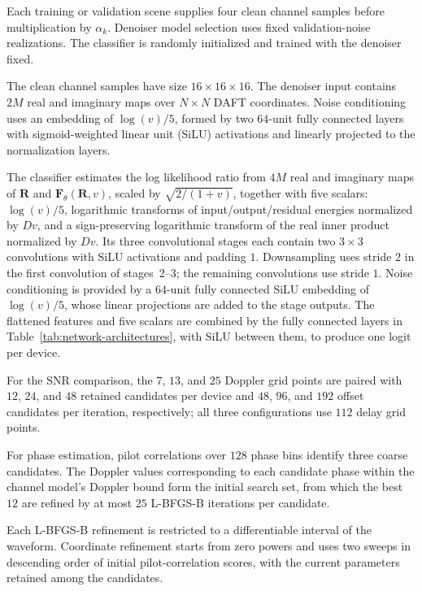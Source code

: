 Each training or validation scene supplies four clean channel samples
before multiplication by $\alpha_k$. Denoiser model selection uses fixed
validation-noise realizations. The classifier is randomly initialized
and trained with the denoiser fixed.

The clean channel samples have size $16\times16\times16$.
The denoiser input contains $2M$ real and imaginary maps over
$N\times N$ DAFT coordinates.
Noise conditioning uses an embedding of $\log(v)/5$, formed by two
$64$-unit fully connected layers with sigmoid-weighted linear unit
(SiLU) activations and linearly projected to the normalization layers.

The classifier estimates the log likelihood ratio from $4M$ real and
imaginary maps of $\mathbf R$ and $\mathbf F_\theta(\mathbf R,v)$,
scaled by $\sqrt{2/(1+v)}$, together with five scalars:
$\log(v)/5$, logarithmic transforms of input/output/residual energies
normalized by $Dv$, and a sign-preserving logarithmic transform of the
real inner product normalized by $Dv$.
Its three convolutional stages each contain two $3\times3$ convolutions
with SiLU activations and padding $1$. Downsampling uses stride $2$ in
the first convolution of stages~2--3; the remaining convolutions use
stride $1$.
Noise conditioning is provided by a $64$-unit fully connected SiLU
embedding of $\log(v)/5$, whose linear projections are added to the
stage outputs. The flattened features and five scalars are combined by
the fully connected layers in Table~\ref{tab:network-architectures},
with SiLU between them, to produce one logit per device.

For the SNR comparison, the $7$, $13$, and $25$ Doppler grid points
are paired with $12$, $24$, and $48$ retained candidates per device
and $48$, $96$, and $192$ offset candidates per iteration, respectively;
all three configurations use $112$ delay grid points.

For phase estimation, pilot correlations over $128$ phase bins identify
three coarse candidates. The Doppler values corresponding to each candidate
phase within the channel model's Doppler bound form the initial search set,
from which the best
$12$ are refined by at most $25$ L-BFGS-B iterations per candidate.

Each L-BFGS-B refinement is restricted to a
differentiable interval of the waveform. Coordinate refinement starts
from zero powers and uses two sweeps in descending order of initial
pilot-correlation scores, with the current parameters retained among
the candidates.

